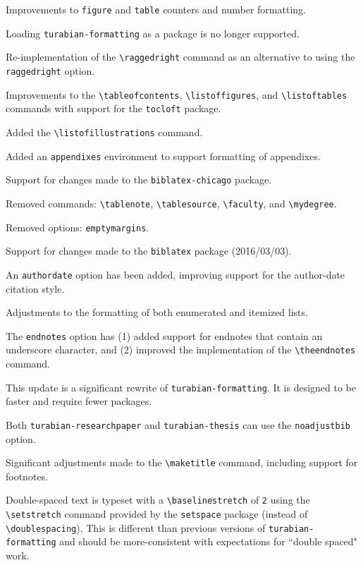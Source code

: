 \documentclass{article}
\newcommand{\textcmd}[1]{\texttt{\textbackslash #1}}
\begin{document}
Improvements to \texttt{figure} and \texttt{table} counters and number formatting.

Loading \texttt{turabian-formatting} as a package is no longer supported.

%

Re-implementation of the \textcmd{raggedright} command as an alternative to using the \texttt{raggedright} option.

Improvements to the \textcmd{tableofcontents}, \textcmd{listoffigures}, and \textcmd{listoftables} commands with support for the \texttt{tocloft} package.

Added the \textcmd{listofillustrations} command.

Added an \texttt{appendixes} environment to support formatting of appendixes.

Support for changes made to the \texttt{biblatex-chicago} package.

Removed commands: \textcmd{tablenote}, \textcmd{tablesource}, \textcmd{faculty}, and \textcmd{mydegree}.

Removed options: \texttt{emptymargins}.

%

Support for changes made to the \texttt{biblatex} package (2016/03/03).

%

An \texttt{authordate} option has been added, improving support for the author-date citation style.

Adjustments to the formatting of both enumerated and itemized lists.

The \texttt{endnotes} option has (1) added support for endnotes that contain an underscore character, and (2) improved the implementation of the \textcmd{theendnotes} command.

%

This update is a significant rewrite of \texttt{turabian-formatting}. It is designed to be faster and require fewer packages.

Both \texttt{turabian-researchpaper} and \texttt{turabian-thesis} can use the \texttt{noadjustbib} option.

Significant adjustments made to the \textcmd{maketitle} command, including support for footnotes.

Double-spaced text is typeset with a \textcmd{baselinestretch} of \texttt{2} using the \textcmd{setstretch} command provided by the \texttt{setspace} package (instead of \textcmd{doublespacing}). This is different than previous versions of \texttt{turabian-formatting} and should be more-consistent with expectations for ``double spaced" work.
\end{document}
